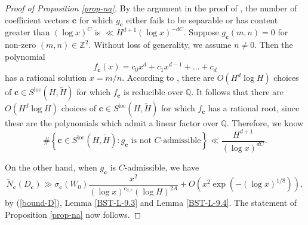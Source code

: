 \documentclass[reqno, 11pt]{amsart}
\theoremstyle{definition}
\theoremstyle{definition}
\newcommand{\cc}{\mathbf{c}}
\newcommand{\QQ}{\mathbb{Q}}
\newcommand{\ZZ}{\mathbb{Z}}
\numberwithin{equation}{section}
\begin{document}
\begin{proof}[Proof of Proposition \ref{prop-na}]
By the argument in the proof of \cite[Proposition 9.1]{BST}, the number of coefficient vectors $\cc$ for which $g_\cc$ either fails to be separable or has content greater than $(\log x)^C$ is 
$\ll H^{d+1}(\log x)^{-dC}.$
Suppose $g_\cc(m, n) = 0$ for non-zero $(m, n) \in \ZZ^2$. Without loss of generality, we assume $n \neq 0$. Then the polynomial
$$f_\cc(x) = c_0 x^d + c_1 x^{d-1} + \dots + c_d$$
has a rational solution $x = m/n$. According to \cite{Kuba}, there are $O(H^d \log H)$ choices of $\cc \in S^{\mathrm{loc}}(H, \tilde{H})$ for which $f_\cc$ is reducible over $\QQ$. It follows that there are $O(H^{d}\log H)$ choices of $\cc \in S^{\mathrm{loc}}(H, \tilde{H})$ for which $f_\cc$ has a rational root, since these are the polynomials which admit a linear factor over $\QQ$. Therefore, we know 
$$\# \left\{ \cc \in S^{\mathrm{loc}}(H, \tilde{H}): g_\cc \text{ is not $C$-admissible} \right\} \ll \frac{H^{d+1}}{(\log x)^{dC}}.$$

On the other hand, when $g_\cc$ is $C$-admissible, we have $$\tilde{N}_\cc(D_\cc) \gg \sigma_\cc(W_0) \frac{x^2}{(\log x)^{c_{d,e}} (\log H)^{2A}} + O \left( x^2 \exp\left( - (\log x)^{1/8} \right) \right),$$
by (\ref{bound-D}), Lemma \ref{BST-L-9.3} and Lemma \ref{BST-L-9.4}. The statement of Proposition \ref{prop-na} now follows.
\end{proof}
\end{document}
